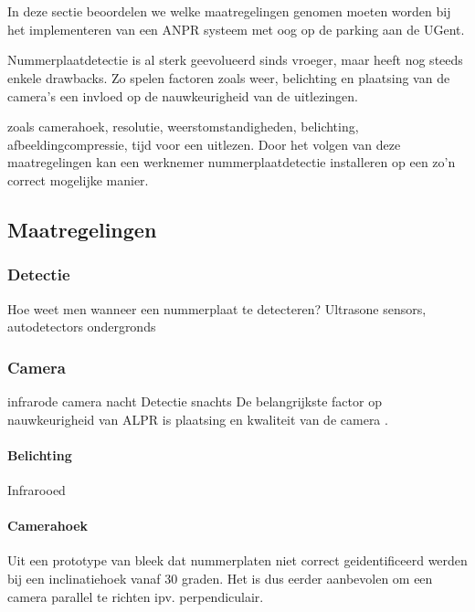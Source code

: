
\chapter{}
\label{ch:maatregelingenraspberrypi}

In deze sectie beoordelen we welke maatregelingen genomen moeten worden bij het implementeren van een ANPR systeem met oog op de parking aan de UGent.

Nummerplaatdetectie is al sterk geevolueerd sinds vroeger, maar heeft nog steeds enkele drawbacks. Zo spelen factoren zoals weer, belichting en plaatsing van de camera's een invloed op de nauwkeurigheid van de uitlezingen.

zoals camerahoek, resolutie, weerstomstandigheden, belichting, afbeeldingcompressie, tijd voor een uitlezen. Door het volgen van deze maatregelingen kan een werknemer nummerplaatdetectie installeren op een zo'n correct mogelijke manier.

\section{Maatregelingen}

\subsection{Detectie}
Hoe weet men wanneer een nummerplaat te detecteren?
Ultrasone sensors, autodetectors ondergronds

\subsection{Camera}
infrarode camera nacht
Detectie snachts \autocite{boonsin2017car}
De belangrijkste factor op nauwkeurigheid van ALPR is plaatsing en kwaliteit van de camera \autocite{openalprcameraplacement}.

\subsubsection{Belichting}
Infrarooed

\subsubsection{Camerahoek}
Uit een prototype van \textcite{arrieta2019prototype} bleek dat nummerplaten niet correct geidentificeerd werden bij een inclinatiehoek vanaf 30 graden. Het is dus eerder aanbevolen om een camera parallel te richten ipv. perpendiculair.

